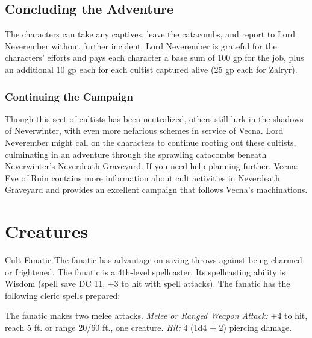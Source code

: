 \documentclass[10pt,a4paper,twoside,bg=print,twocolumn,openany,nodeprecatedcode]{dndbook}
\begin{document}
\section{Concluding the Adventure}
The characters can take any captives, leave the catacombs, and report to Lord Neverember without further incident. Lord Neverember is grateful for the characters' efforts and pays each character a base sum of 100 gp for the job, plus an additional 10 gp each for each cultist captured alive (25 gp each for Zalryr).
\subsection{Continuing the Campaign}
Though this sect of cultists has been neutralized, others still lurk in the shadows of Neverwinter, with even more nefarious schemes in service of Vecna. Lord Neverember might call on the characters to continue rooting out these cultists, culminating in an adventure through the sprawling catacombs beneath Neverwinter's Neverdeath Graveyard. If you need help planning further, Vecna: Eve of Ruin contains more information about cult activities in Neverdeath Graveyard and provides an excellent campaign that follows Vecna's machinations.

\appendix

\chapter{Creatures}

\begin{DndMonster}[float=ht]{Cult Fanatic}
\DndMonsterBasics[
armor-class = {13 (leather armor)},
hit-points = {\DndDice{6d8 + 6}},
speed = {30 ft.}
]
\DndMonsterAbilityScores[
 str = 11,
 dex = 14,
 con = 12,
 int = 10,
 wis = 13,
 cha = 14
]
\DndMonsterDetails[
skills = {Deception +4, Persuasion +4, Religion +2},
languages = {any one language (usually Common)},
challenge = 2,
]
The fanatic has advantage on saving throws against being charmed or frightened.
The fanatic is a 4th-level spellcaster. Its spellcasting ability is Wisdom (spell save DC 11, +3 to hit with spell attacks). The fanatic has the following cleric spells prepared:
\begin{DndMonsterSpells}
\end{DndMonsterSpells}
\par
{}
The fanatic makes two melee attacks.
\textsl{Melee or Ranged Weapon Attack:} +4 to hit, reach 5 ft. or range 20/60 ft., one creature. \textsl{Hit:} 4 (1d4 + 2) piercing damage.
\end{DndMonster}
\end{document}
